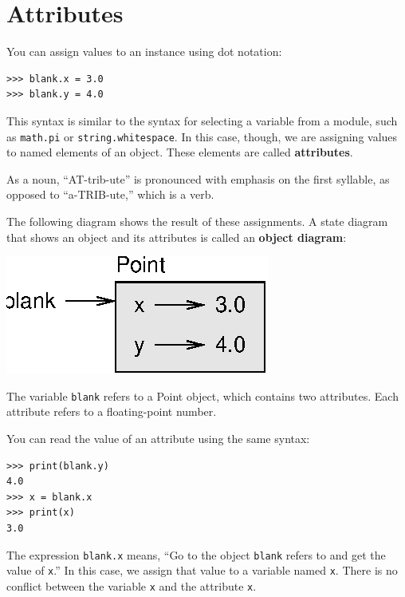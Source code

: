 \documentclass[10pt]{book}
\begin{document}
\section{Attributes}


You can assign values to an instance using dot notation:

\beforeverb
\begin{verbatim}
>>> blank.x = 3.0
>>> blank.y = 4.0
\end{verbatim}
\afterverb
%
This syntax is similar to the syntax for selecting a variable from a
module, such as {\tt math.pi} or {\tt string.whitespace}.  In this case,
though, we are assigning values to named elements of an object.
These elements are called {\bf attributes}.

As a noun, ``AT-trib-ute'' is pronounced with emphasis on the first
syllable, as opposed to ``a-TRIB-ute,'' which is a verb.

The following diagram shows the result of these assignments.
A state diagram that shows an object and its attributes is
called an {\bf object diagram}:


\beforefig
\centerline{\includegraphics{figs/point.eps}}
\afterfig

The variable {\tt blank} refers to a Point object, which
contains two attributes.  Each attribute refers to a
floating-point number.

You can read the value of an attribute using the same syntax:

\beforeverb
\begin{verbatim}
>>> print(blank.y)
4.0
>>> x = blank.x
>>> print(x)
3.0
\end{verbatim}
\afterverb
%
The expression {\tt blank.x} means, ``Go to the object {\tt blank}
refers to and get the value of {\tt x}.'' In this case, we assign that
value to a variable named {\tt x}.  There is no conflict between
the variable {\tt x} and the attribute {\tt x}.
\end{document}
